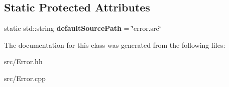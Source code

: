 \subsection*{Static Protected Attributes}
\begin{DoxyCompactItemize}
\item 
\hypertarget{classstb_1_1Error_a199497abb5bd7a2ad6fa119f5f718ea3}{static std\+::string {\bfseries default\+Source\+Path} = \char`\"{}error.\+src\char`\"{}}\label{classstb_1_1Error_a199497abb5bd7a2ad6fa119f5f718ea3}

\end{DoxyCompactItemize}


The documentation for this class was generated from the following files\+:\begin{DoxyCompactItemize}
\item 
src/Error.\+hh\item 
src/Error.\+cpp\end{DoxyCompactItemize}
